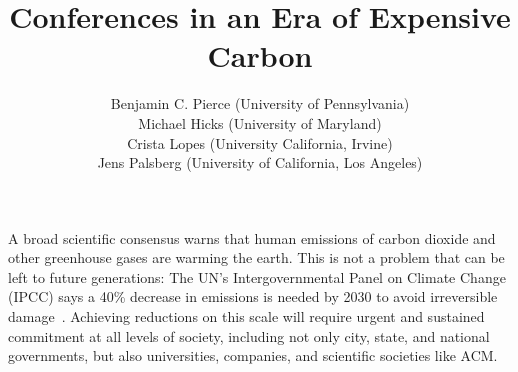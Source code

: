 \documentclass[12pt]{article}
\begin{document}
\title{\Huge Conferences in an Era of Expensive Carbon}
\author{Benjamin C. Pierce (University of Pennsylvania) \\
Michael Hicks (University of Maryland) \\
Crista Lopes (University California, Irvine) \\
Jens Palsberg (University of California, Los Angeles)}

\maketitle




A broad scientific consensus warns that human
emissions of carbon dioxide and other greenhouse gases are warming the earth.
This is not a problem that can be left to future
generations: The UN's Intergovernmental
Panel on Climate Change (IPCC) says a 40\% decrease in
emissions is needed by 2030 to avoid irreversible damage~\cite{IPCC-report}.
Achieving reductions on this scale will
require urgent and sustained commitment at all levels of society, including
not only city, state, and national governments, but also 
universities, companies, and scientific societies
like ACM. 


\end{document}
